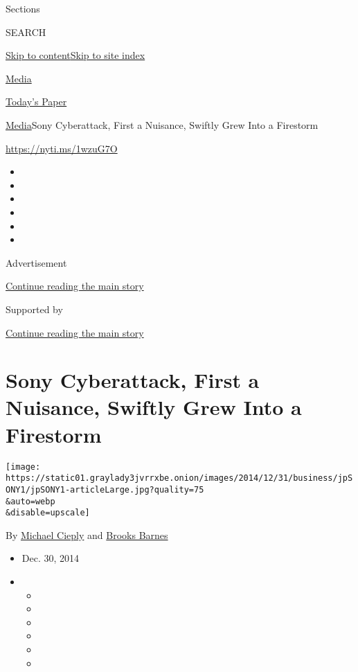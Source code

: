 Sections

SEARCH

\protect\hyperlink{site-content}{Skip to
content}\protect\hyperlink{site-index}{Skip to site index}

\href{https://www.nytimes3xbfgragh.onion/pages/business/media/index.html}{Media}

\href{https://myaccount.nytimes3xbfgragh.onion/auth/login?response_type=cookie\&client_id=vi}{}

\href{https://www.nytimes3xbfgragh.onion/section/todayspaper}{Today's
Paper}

\href{/pages/business/media/index.html}{Media}\textbar{}Sony
Cyberattack, First a Nuisance, Swiftly Grew Into a Firestorm

\url{https://nyti.ms/1wzuG7O}

\begin{itemize}
\item
\item
\item
\item
\item
\item
\end{itemize}

Advertisement

\protect\hyperlink{after-top}{Continue reading the main story}

Supported by

\protect\hyperlink{after-sponsor}{Continue reading the main story}

\hypertarget{sony-cyberattack-first-a-nuisance-swiftly-grew-into-a-firestorm}{%
\section{Sony Cyberattack, First a Nuisance, Swiftly Grew Into a
Firestorm}\label{sony-cyberattack-first-a-nuisance-swiftly-grew-into-a-firestorm}}

\texttt{[image: https://static01.graylady3jvrrxbe.onion/images/2014/12/31/business/jpSONY1/jpSONY1-articleLarge.jpg?quality=75\\\&auto=webp\\\&disable=upscale]}

By \href{http://www.nytimes3xbfgragh.onion/by/michael-cieply}{Michael
Cieply} and
\href{http://www.nytimes3xbfgragh.onion/by/brooks-barnes}{Brooks Barnes}

\begin{itemize}
\item
  Dec. 30, 2014
\item
  \begin{itemize}
  \item
  \item
  \item
  \item
  \item
  \item
  \end{itemize}
\end{itemize}

